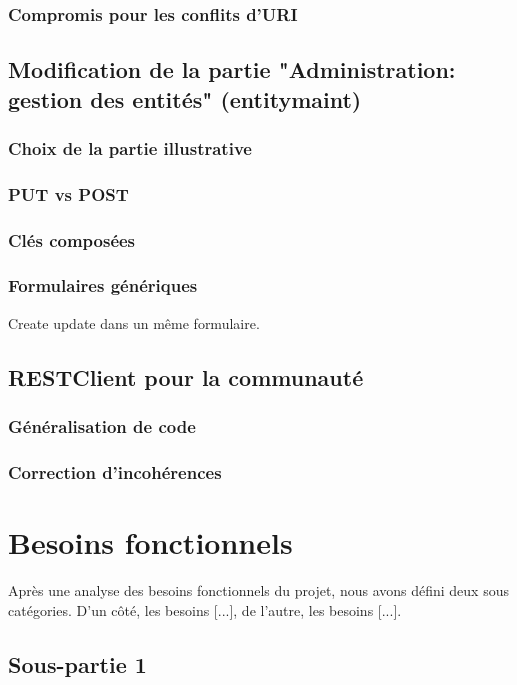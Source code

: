 \subsubsection{Compromis pour les conflits d'URI}
\subsection{Modification de la partie "Administration: gestion des entités" (entitymaint)  }
\subsubsection{Choix de la partie illustrative}
\subsubsection{PUT vs POST}
\subsubsection{Clés composées}
\subsubsection{Formulaires génériques }
Create update dans un même formulaire.
\subsection{RESTClient pour la communauté}
\subsubsection{Généralisation de code}
\subsubsection{Correction d'incohérences}



\iffalse
\section{Besoins fonctionnels}

Après une analyse des besoins fonctionnels du projet, nous avons défini deux sous catégories. D'un côté, les besoins [...], de l'autre, les besoins [...].

\subsection{Sous-partie 1}


